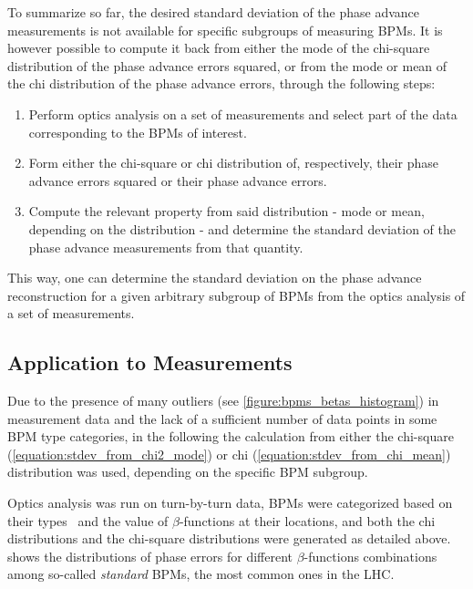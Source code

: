 To summarize so far, the desired standard deviation of the phase advance measurements is not available for specific subgroups of measuring BPMs.
It is however possible to compute it back from either the mode of the chi-square distribution of the phase advance errors squared, or from the mode or mean of the chi distribution of the phase advance errors, through the following steps:
\begin{enumerate}
    \item Perform optics analysis on a set of measurements and select part of the data corresponding to the BPMs of interest.
    \item Form either the chi-square or chi distribution of, respectively, their phase advance errors squared or their phase advance errors.
    \item Compute the relevant property from said distribution - mode or mean, depending on the distribution - and determine the standard deviation of the phase advance measurements from that quantity.
\end{enumerate}
This way, one can determine the standard deviation on the phase advance reconstruction for a given arbitrary subgroup of BPMs from the optics analysis of a set of measurements.

\subsection*{Application to Measurements}

Due to the presence of many outliers (see \cref{figure:bpms_betas_histogram}) in measurement data and the lack of a sufficient number of data points in some BPM type categories, in the following the calculation from either the chi-square (\cref{equation:stdev_from_chi2_mode}) or chi (\cref{equation:stdev_from_chi_mean}) distribution was used, depending on the specific BPM subgroup.

Optics analysis was run on turn-by-turn data, BPMs were categorized based on their types~\cite{CERN:Equipment_Codes} and the value of \(\beta\)-functions at their locations, and both the chi distributions and the chi-square distributions were generated as detailed above.
 shows the distributions of phase errors for different \(\beta\)-functions combinations among so-called \textit{standard} BPMs, the most common ones in the LHC.

